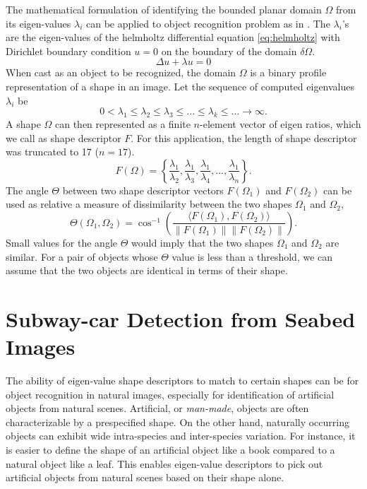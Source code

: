 The mathematical formulation of identifying the bounded planar domain $\Omega$ from its eigen-values $\lambda_{i}$ can be applied to object recognition problem as in \cite{khabou, zuliani}. The $\lambda_{i}$'s are the eigen-values of the helmholtz differential equation \eqref{eq:helmholtz} with Dirichlet boundary condition $u=0$ on the boundary of the domain $\delta\Omega$.
%
\begin{equation} \label{eq:helmholtz}
\Delta u+\lambda u = 0
\end{equation}
%
When cast as an object to be recognized, the domain $\Omega$ is a binary profile representation of a shape in an image.
Let the sequence of computed eigenvalues $\lambda_i$ be
%
\begin{equation} \label{eq:eigenvalue}
0<\lambda_{1}\leq\lambda_{2}\leq\lambda_{3}\leq\dots\leq\lambda_{k}\leq\dots\rightarrow\infty.
\end{equation}
%
A shape $\Omega$ can then represented as a finite $n$-element vector of eigen ratios, which we call as shape descriptor $F$. For this application, the length of shape descriptor was truncated to 17 ($n=17$).
%
\begin{equation} \label{eq:eigenratio}
F(\Omega) = \left\{\frac{\lambda_{1}}{\lambda_{2}},\frac{\lambda_{1}}{\lambda_{3}},\frac{\lambda_{1}}{\lambda_{4}},\dots,\frac{\lambda_{1}}{\lambda_{n}}\right\}.
\end{equation}
%
The angle $\Theta$ between two shape descriptor vectors $F(\Omega_{1})$ and $F(\Omega_{2})$ can be used as relative a measure of dissimilarity between the two shapes $\Omega_{1}$ and $\Omega_{2}$,
%
\begin{equation} \label{eq:eigendist}
\Theta\left(\Omega_{1},\Omega_{2}\right)=\cos^{-1}\left(\frac{\langle F(\Omega_{1}),F(\Omega_{2})\rangle}{\|F(\Omega_{1})\|\|F(\Omega_{2})\|}\right).
\end{equation}
%
Small values for the angle $\Theta$  would imply that the two shapes $\Omega_{1}$ and $\Omega_{2}$ are similar.
For a pair of objects whose $\Theta$ value is less than a threshold, 
we can assume that the two objects are identical in terms of their shape.


\section{Subway-car Detection from Seabed Images} \label{sec:subwaycar_results}


The ability of eigen-value shape descriptors to match to certain shapes can be for object recognition in natural images, especially for identification of artificial objects from natural scenes. Artificial, or \textit{man-made}, objects are often characterizable by a prespecified shape. On the other hand, naturally occurring objects can exhibit wide intra-species and inter-species variation. For instance, it is easier to define the shape of an artificial object like a book compared to a natural object like a leaf. This enables eigen-value descriptors to pick out artificial objects from natural scenes based on their shape alone.

